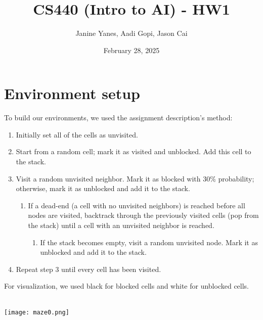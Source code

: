 \documentclass{article}
\title{CS440 (Intro to AI) - HW1}
\author{Janine Yanes, Aadi Gopi, Jason Cai}
\date{February 28, 2025}
\begin{document}
\maketitle

\section{Environment setup}
To build our environments, we used the assignment description's method:
\begin{enumerate}
    \item Initially set all of the cells as unvisited.
    \item Start from a random cell; mark it as visited and unblocked. Add this cell to the stack.
    \item Visit a random unvisited neighbor. Mark it as blocked with 30\% probability; otherwise, mark it as unblocked and add it to the stack.
    \begin{enumerate}
        \item If a dead-end (a cell with no unvisited neighbors) is reached before all nodes are visited, backtrack through the previously visited cells (pop from the stack) until a cell with an unvisited neighbor is reached.
        \begin{enumerate}
            \item If the stack becomes empty, visit a random unvisited node. Mark it as unblocked and add it to the stack.
        \end{enumerate}
    \end{enumerate}  
    \item Repeat step 3 until every cell has been visited.
\end{enumerate}
For visualization, we used black for blocked cells and white for unblocked cells.\\\\
\begin{minipage}[t]{\linewidth}
    \centering
    \texttt{[image: maze0.png]}
\end{minipage}
\end{document}
